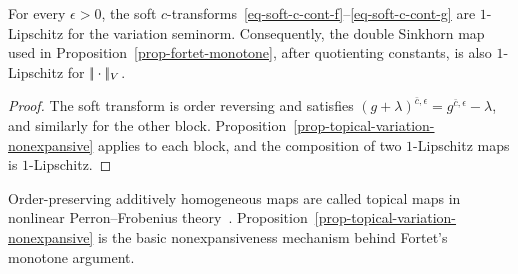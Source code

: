 \begin{cor}\label{cor-soft-transform-nonexpansive}
	For every $\epsilon>0$, the soft $c$-transforms~\eqref{eq-soft-c-cont-f}--\eqref{eq-soft-c-cont-g} are $1$-Lipschitz for the variation seminorm. Consequently, the double Sinkhorn map used in Proposition~\ref{prop-fortet-monotone}, after quotienting constants, is also $1$-Lipschitz for $|\!| \cdot |\!|_V$.
\end{cor}

\begin{proof}
	The soft transform is order reversing and satisfies $(g+\lambda)^{\bar c,\epsilon}=g^{\bar c,\epsilon}-\lambda$, and similarly for the other block. Proposition~\ref{prop-topical-variation-nonexpansive} applies to each block, and the composition of two $1$-Lipschitz maps is $1$-Lipschitz.
\end{proof}

\begin{rem}\label{rem-topical-maps}
	Order-preserving additively homogeneous maps are called topical maps in nonlinear Perron--Frobenius theory~\cite{lemmens2012nonlinear}. Proposition~\ref{prop-topical-variation-nonexpansive} is the basic nonexpansiveness mechanism behind Fortet's monotone argument.
\end{rem}

